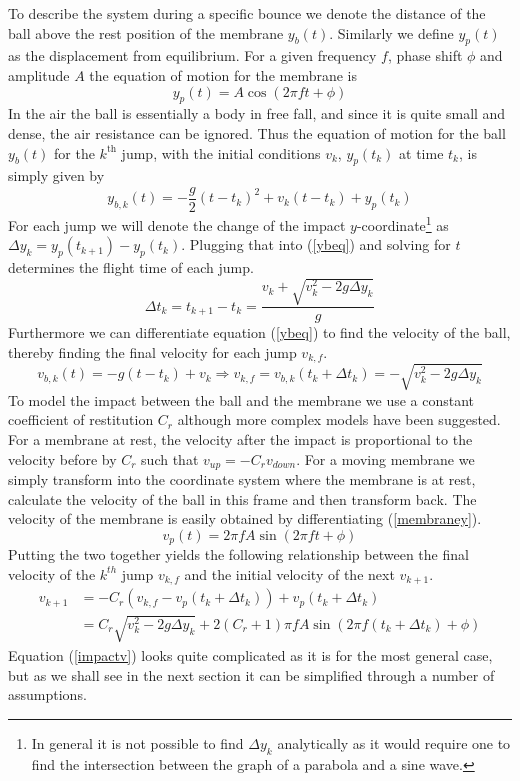 \documentclass[12pt,oneside,a4paper]{article}
\numberwithin{equation}{section}
\begin{document}
{{{{To describe the system during a specific bounce we denote the distance of the 
ball above the rest position of the membrane $y_b(t)$. Similarly we define 
$y_p(t)$ as the displacement from equilibrium. For a given frequency $f$, phase 
shift $\phi$ and amplitude $A$ the equation of motion for the membrane is
\begin{equation}
	y_p(t)= A \cos(2\pi f t+ \phi)
	\label{membraney}
\end{equation}
In the air the ball is essentially a body in free fall, and since it is quite small and dense, the air resistance can be ignored. Thus the equation of motion for the ball $y_b(t)$ for the $k^\text{th}$ jump, with the initial conditions $v_k$, $y_p(t_k)$ at time $t_k$, is simply given by
\begin{equation}
	y_{b,k}(t) = -\frac{g}{2}(t-t_k)^2+v_k(t-t_k)+y_p(t_k)
	\label{ybeq}
\end{equation}
For each jump we will denote the change of the impact $y$-coordinate\footnote{In general it is not possible to find $\Delta y_k$ analytically as it would require one to find the intersection between the graph of a parabola and a sine wave.} as $\Delta y_{k}=y_p(t_{k+1})-y_p(t_{k})$. Plugging that into (\ref{ybeq}) and solving for $t$ determines the flight time of each jump.
\begin{equation}
	\Delta t_{k} = t_{k+1}-t_{k} = \frac{v_{k}+\sqrt{v_k^2-2g\Delta y_k}}{g}
	\label{flytime}
\end{equation}
Furthermore we can differentiate equation (\ref{ybeq}) to find the velocity of the ball, thereby finding the final velocity for each jump $v_{k,f}$.
\begin{equation}
	v_{b,k}(t) = -g(t-t_k)+v_k \Rightarrow v_{k,f} = v_{b,k}(t_k+\Delta t_k) = 
	-\sqrt{v_k^2-2g\Delta y_k}
\end{equation}
To model the impact between the ball and the membrane we use a constant 
coefficient of restitution $C_r$ although more complex models have been 
suggested\cite{muller}. For a membrane at rest, the velocity after the impact 
is proportional to the velocity before by $C_r$ such that $v_{up}=-C_r 
v_{down}$. For a moving membrane we simply transform into the coordinate system 
where the membrane is at rest, calculate the velocity of the ball in this frame 
and then transform back. The velocity of the membrane is easily obtained by 
differentiating (\ref{membraney}).
\begin{equation}
	v_p(t) = 2\pi f A \sin(2\pi f t+ \phi)
	\label{membranev}
\end{equation}
Putting the two together yields the following relationship between the final velocity of the $k^{th}$ jump $v_{k,f}$ and the initial velocity of the next $v_{k+1}$.
\begin{align}
	v_{k+1} &= -C_r(v_{k,f}-v_p(t_k+\Delta t_k))+v_p(t_k+\Delta t_k) \nonumber \\
	&= C_r \sqrt{v_k^2-2g\Delta y_k}+2(C_r+1)\pi f A \sin(2\pi f (t_k+\Delta t_k)+ \phi) \label{impactv}
\end{align}
Equation (\ref{impactv}) looks quite complicated as it is for the most general case, but as we shall see in the next section it can be simplified through a number of assumptions.

}}}}
\end{document}
